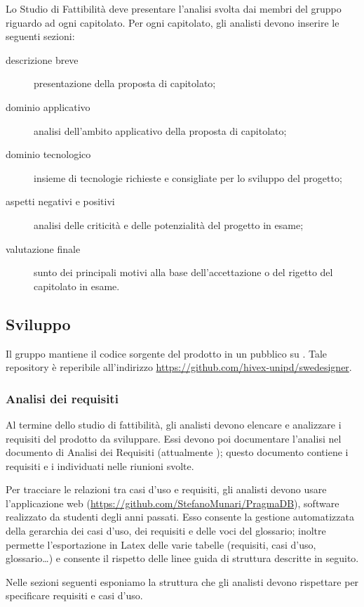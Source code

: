 Lo Studio di Fattibilità deve presentare l'analisi svolta dai membri del gruppo riguardo ad ogni capitolato. Per ogni capitolato, gli analisti devono inserire le seguenti sezioni:
\begin{description}
	\item[descrizione breve] presentazione della proposta di capitolato; 
	\item[dominio applicativo] analisi dell'ambito applicativo della proposta di capitolato; 
	\item[dominio tecnologico] insieme di tecnologie richieste e consigliate per lo sviluppo del progetto;
	\item[aspetti negativi e positivi] analisi delle criticità e delle potenzialità del progetto in esame;
	\item[valutazione finale] sunto dei principali motivi alla base dell'accettazione o del rigetto del capitolato in esame.
\end{description}


\subsection{Sviluppo}
Il gruppo mantiene il codice sorgente del prodotto in un  pubblico su . Tale repository è reperibile all'indirizzo \url{https://github.com/hivex-unipd/swedesigner}.

\subsubsection{Analisi dei requisiti}
Al termine dello studio di fattibilità, gli analisti devono elencare e analizzare i requisiti del prodotto da sviluppare. Essi devono poi documentare l'analisi nel documento di Analisi dei Requisiti (attualmente \AdR); questo documento contiene i requisiti e i  individuati nelle riunioni svolte.

Per tracciare le relazioni tra casi d'uso e requisiti, gli analisti devono usare l'applicazione web  (\url{https://github.com/StefanoMunari/PragmaDB}), software realizzato da studenti degli anni passati. Esso consente la gestione automatizzata della gerarchia dei casi d'uso, dei requisiti e delle voci del glossario; inoltre permette l'esportazione in Latex delle varie tabelle (requisiti, casi d'uso, glossario\dots) e consente il rispetto delle linee guida di struttura descritte in seguito.

Nelle sezioni seguenti esponiamo la struttura che gli analisti devono rispettare per specificare requisiti e casi d'uso.

